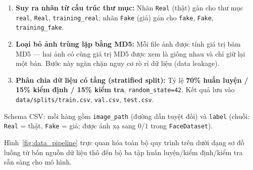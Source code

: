 \begin{enumerate}
  \item \textbf{Suy ra nhãn từ cấu trúc thư mục:} Nhãn \texttt{Real} (thật) gán cho thư mục \texttt{real}, \texttt{Real}, \texttt{training\_real}; nhãn \texttt{Fake} (giả) gán cho \texttt{fake}, \texttt{Fake}, \texttt{training\_fake}.
  \item \textbf{Loại bỏ ảnh trùng lặp bằng MD5:} Mỗi file ảnh được tính giá trị băm MD5 --- hai ảnh có cùng giá trị MD5 được xem là giống nhau và chỉ giữ lại một bản. Bước này ngăn chặn nguy cơ rò rỉ dữ liệu (data leakage).
  \item \textbf{Phân chia dữ liệu có tầng (stratified split):} Tỷ lệ \textbf{70\% huấn luyện / 15\% kiểm định / 15\% kiểm tra}, \texttt{random\_state=42}. Kết quả lưu vào \texttt{data/splits/train.csv}, \texttt{val.csv}, \texttt{test.csv}.
\end{enumerate}

Schema CSV: mỗi hàng gồm \texttt{image\_path} (đường dẫn tuyệt đối) và \texttt{label} (chuỗi: \texttt{Real} = thật, \texttt{Fake} = giả; được ánh xạ sang $0$/$1$ trong \texttt{FaceDataset}).

Hình~\ref{fig:data_pipeline} trực quan hóa toàn bộ quy trình trên dưới dạng sơ đồ luồng từ bốn nguồn dữ liệu thô đến bộ ba tập huấn luyện/kiểm định/kiểm tra sẵn sàng cho mô hình.

